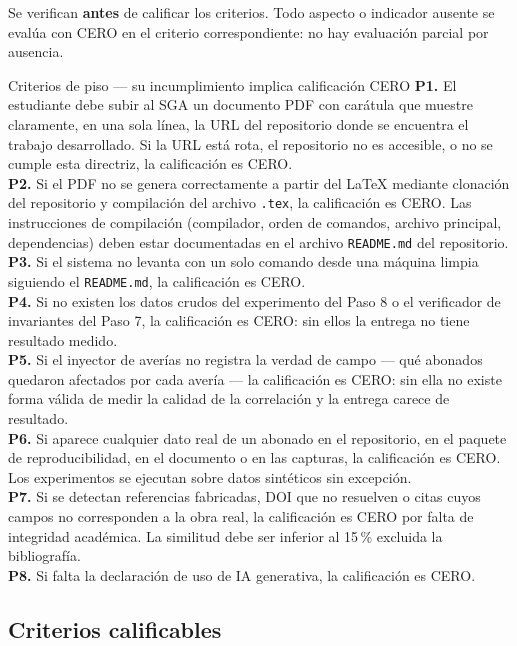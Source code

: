\documentclass[11pt,a4paper]{article}
\begin{document}
	Se verifican \textbf{antes} de calificar los criterios. Todo aspecto o indicador ausente se evalúa con CERO en el criterio correspondiente: no hay evaluación parcial por ausencia.
	
	\begin{pisoBox}{Criterios de piso --- su incumplimiento implica calificación CERO}
		\textbf{P1.} El estudiante debe subir al SGA un documento PDF con carátula que muestre claramente, en una sola línea, la URL del repositorio donde se encuentra el trabajo desarrollado. Si la URL está rota, el repositorio no es accesible, o no se cumple esta directriz, la calificación es CERO.\\[5pt]
		\textbf{P2.} Si el PDF no se genera correctamente a partir del LaTeX mediante clonación del repositorio y compilación del archivo \texttt{.tex}, la calificación es CERO. Las instrucciones de compilación (compilador, orden de comandos, archivo principal, dependencias) deben estar documentadas en el archivo \texttt{README.md} del repositorio.\\[5pt]
		\textbf{P3.} Si el sistema no levanta con un solo comando desde una máquina limpia siguiendo el \texttt{README.md}, la calificación es CERO.\\[5pt]
		\textbf{P4.} Si no existen los datos crudos del experimento del Paso 8 o el verificador de invariantes del Paso 7, la calificación es CERO: sin ellos la entrega no tiene resultado medido.\\[5pt]
		\textbf{P5.} Si el inyector de averías no registra la verdad de campo --- qué abonados quedaron afectados por cada avería --- la calificación es CERO: sin ella no existe forma válida de medir la calidad de la correlación y la entrega carece de resultado.\\[5pt]
		\textbf{P6.} Si aparece cualquier dato real de un abonado en el repositorio, en el paquete de reproducibilidad, en el documento o en las capturas, la calificación es CERO. Los experimentos se ejecutan sobre datos sintéticos sin excepción.\\[5pt]
		\textbf{P7.} Si se detectan referencias fabricadas, DOI que no resuelven o citas cuyos campos no corresponden a la obra real, la calificación es CERO por falta de integridad académica. La similitud debe ser inferior al 15\,\% excluida la bibliografía.\\[5pt]
		\textbf{P8.} Si falta la declaración de uso de IA generativa, la calificación es CERO.
	\end{pisoBox}
	
	\subsection{Criterios calificables}
	
\end{document}
